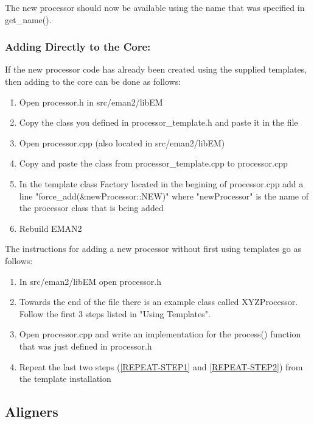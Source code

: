       The new processor should now be available using the name that was
      specified in get\_name().



  \subsubsection{Adding Directly to the Core:}

  If the new processor code has already been created using the supplied
  templates, then adding to the core can be done as follows:
  \begin{enumerate}
    \item
      Open processor.h in src/eman2/libEM
    \item
      Copy the class you defined in processor\_template.h and paste it
      in the file
    \item
      Open processor.cpp (also located in src/eman2/libEM)
    \item
      Copy and paste the class from processor\_template.cpp to
      processor.cpp
    \item \label{REPEAT-STEP1}
      In the template class Factory located in the begining of
      processor.cpp add a line "force\_add(\&newProcessor::NEW)" where
      "newProcessor" is the name of the processor class that is being
      added 
   \item \label {REPEAT-STEP2}
     Rebuild EMAN2
  \end{enumerate}

  The instructions for adding a new processor without first using
  templates go as follows:
  \begin{enumerate}
    \item
      In src/eman2/libEM open processor.h
    \item
      Towards the end of the file there is an example class called
      XYZProcessor.  Follow the first 3 steps listed in "Using
      Templates". 
    \item
      Open processor.cpp and write an implementation for the process() 
      function that was just defined in processor.h
    \item
      Repeat the last two steps (\ref{REPEAT-STEP1} and \ref{REPEAT-STEP2})
      from the template installation
  \end{enumerate}

\subsection{Aligners} 
  \label{ADDING-ALIGNERS} 

